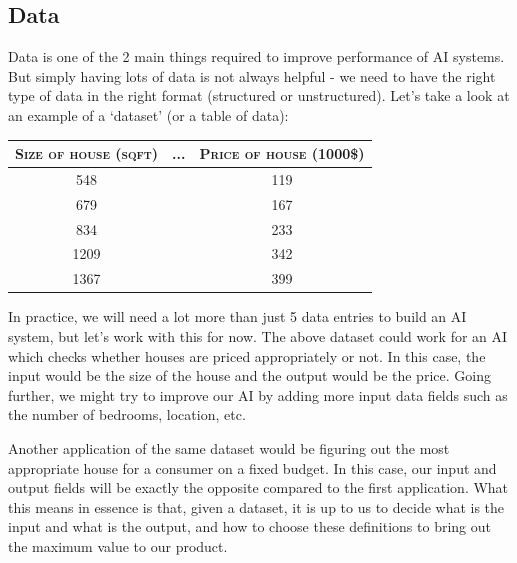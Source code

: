 \documentclass{article}[a4paper,12pt]
\theoremstyle{definition}
\begin{document}
\subsection{Data}
Data is one of the 2 main things required to improve performance of AI systems. But simply having lots of data is not always helpful - we need to have the right type of data in the right format (structured or unstructured). Let's take a look at an example of a `dataset' (or a table of data):
\begin{center}
\begin{tabular}{|c|c|c|}
\hline
\textsc{Size of house (sqft)} & ... & \textsc{Price of house} (1000\$)\\
\hline
548 &  & 119\\
\hline
679 &  & 167\\
\hline
834 &  & 233\\
\hline
1209 &  & 342\\
\hline
1367 &  & 399\\
\hline
\end{tabular}
\end{center}
In practice, we will need a lot more than just 5 data entries to build an AI system, but let's work with this for now. The above dataset could work for an AI which checks whether houses are priced appropriately or not. In this case, the input would be the size of the house and the output would be the price. Going further, we might try to improve our AI by adding more input data fields such as the number of bedrooms, location, etc.
\vspace{6pt}

Another application of the same dataset would be figuring out the most appropriate house for a consumer on a fixed budget. In this case, our input and output fields will be exactly the opposite compared to the first application. What this means in essence is that, given a dataset, it is up to us to decide what is the input and what is the output, and how to choose these definitions to bring out the maximum value to our product.
\end{document}
